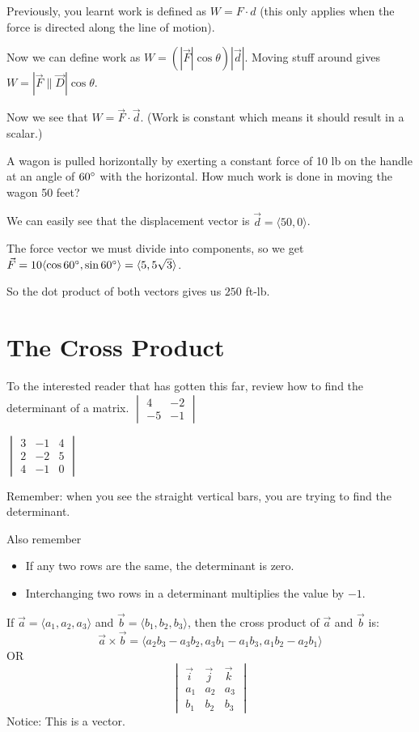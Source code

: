 \documentclass[../calc3.tex]{subfiles}
\begin{document}
Previously, you learnt work is defined as $W=F\cdot d$ (this only applies when the force is directed along the line of motion).

Now we can define work as $W=(|\vec{F}|\cos\theta)|\vec{d}|$. Moving stuff around gives $W=|\vec{F}\|\vec{D}|\cos\theta$.

Now we see that $W=\vec{F}\cdot \vec{d}$. (Work is constant which means it should result in a scalar.)

\begin{example}
    A wagon is pulled horizontally by exerting a constant force of 10 lb on the handle at an angle of $60\degree$ with the horizontal. How much work is done in moving the wagon 50 feet?

    We can easily see that the displacement vector is $\vec{d}=\langle 50,0\rangle$.

    The force vector we must divide into components, so we get $\vec{F}=10\langle \cos 60\degree, \sin 60\degree\rangle = \langle 5,5\sqrt{3}\rangle$.

    So the dot product of both vectors gives us $250$ ft-lb.
\end{example}

\section{The Cross Product}
To the interested reader that has gotten this far, review how to find the determinant of a matrix.
\ex $\begin{vmatrix}
    4&-2\\-5&-1
\end{vmatrix}$

\ex $\begin{vmatrix}
    3&-1&4\\2&-2&5\\4&-1&0
\end{vmatrix}$

Remember: when you see the straight vertical bars, you are trying to find the determinant.

Also remember 
\begin{itemize}
    \item If any two rows are the same, the determinant is zero.
    \item Interchanging two rows in a determinant multiplies the value by $-1$.
\end{itemize}

\begin{definition}
    If $\vec{a}=\langle a_1,a_2,a_3\rangle$ and $\vec{b}=\langle b_1,b_2,b_3\rangle$, then the cross product of $\vec{a}$ and $\vec{b}$ is:
    \[ \vec{a}\times \vec{b}=\langle a_2b_3-a_3b_2,a_3b_1-a_1b_3,a_1b_2-a_2b_1\rangle \]
    OR 
    \[ \begin{vmatrix}
        \vec{i} & \vec{j} & \vec{k}\\
        a_1 & a_2 & a_3\\
        b_1 & b_2 & b_3
    \end{vmatrix} \]
    Notice: This is a vector.
\end{definition}
\end{document}
